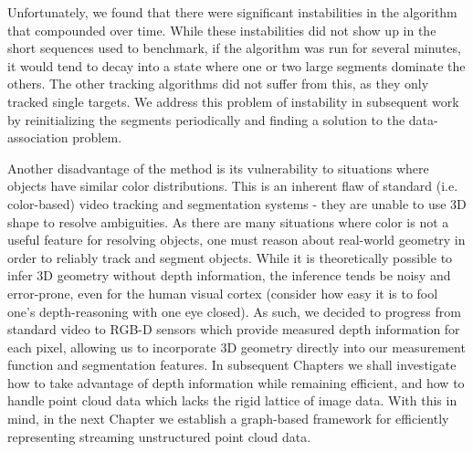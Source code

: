 Unfortunately, we found that there were significant instabilities in the algorithm that compounded over time. While these instabilities did not show up in the short sequences used to benchmark, if the algorithm was run for several minutes, it would tend to decay into a state where one or two large segments dominate the others. The other tracking algorithms did not suffer from this, as they only tracked single targets. We address this problem of instability in subsequent work by reinitializing the segments periodically and finding a solution to the data-association problem.

Another disadvantage of the method is its vulnerability to situations where objects have similar color distributions. This is an inherent flaw of standard (i.e. color-based) video tracking and segmentation systems - they are unable to use 3D shape to resolve ambiguities. As there are many situations where color is not a useful feature for resolving objects, one must reason about real-world geometry in order to reliably track and segment objects. While it is theoretically possible to infer 3D geometry without depth information, the inference tends be noisy and error-prone, even for the human visual cortex (consider how easy it is to fool one's depth-reasoning with one eye closed). As such, we decided to progress from standard video to RGB-D sensors which provide measured depth information for each pixel, allowing us to incorporate 3D geometry directly into our measurement function and segmentation features. In subsequent Chapters we shall investigate how to take advantage of depth information while remaining efficient, and how to handle point cloud data which lacks the rigid lattice of image data. With this in mind, in the next Chapter we establish a graph-based framework for efficiently representing streaming unstructured point cloud data. 


